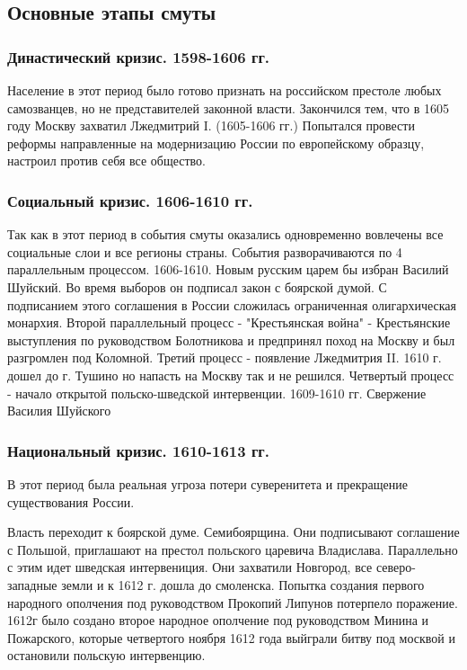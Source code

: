 \documentclass[a4paper]{article}
\begin{document}
\subsection{Основные этапы смуты}
\subsubsection{Династический кризис. 1598-1606 гг.}
Население в этот период было готово признать на российском престоле любых самозванцев, но не представителей законной власти.
Закончился тем, что в 1605 году Москву захватил Лжедмитрий I. (1605-1606 гг.)
Попытался провести реформы направленные на модернизацию России по европейскому образцу, настроил против себя все общество. 
\subsubsection{Социальный кризис. 1606-1610 гг.}
Так как в этот период в события смуты оказались одновременно вовлечены все социальные слои и все регионы страны. События разворачиваются по 4 параллельным процессом.
1606-1610. Новым русским царем бы избран Василий Шуйский. Во время выборов он подписал закон с боярской думой. С подписанием этого соглашения в России сложилась ограниченная олигархическая монархия.
Второй параллельный процесс - "Крестьянская война" - Крестьянские выступления по руководством Болотникова и предпринял поход на Москву и был разгромлен под Коломной.
Третий процесс - появление Лжедмитрия II. 1610 г. дошел до г. Тушино но напасть на Москву так и не решился. 
Четвертый процесс - начало открытой польско-шведской интервенции. 1609-1610 гг. 
Свержение Василия Шуйского
\subsubsection{Национальный кризис. 1610-1613 гг.}
В этот период была реальная угроза потери суверенитета и прекращение существования России.

Власть переходит к боярской думе. Семибоярщина. Они подписывают соглашение с Польшой, приглашают на престол польского царевича Владислава.
Параллельно с этим идет шведская интервениция. Они захватили Новгород, все северо-западные земли и к 1612 г. дошла до смоленска.
Попытка создания первого народного ополчения под руководством Прокопий Липунов потерпело поражение.
1612г было создано второе народное ополчение под руководством Минина и Пожарского, которые четвертого ноября 1612 года выйграли битву под москвой и остановили польскую интервенцию.
\end{document}

